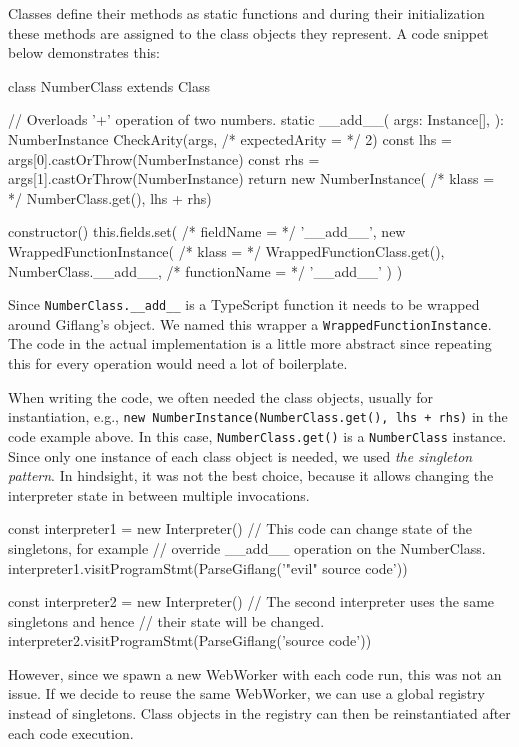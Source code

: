 Classes define their methods as static functions and during their initialization these methods are assigned to the class objects they represent.
A code snippet below demonstrates this:
\begin{code}
class NumberClass extends Class {
    // Overloads '+' operation of two numbers.
    static __add__(
        args: Instance[],
    ): NumberInstance {
        CheckArity(args, /* expectedArity = */ 2)
        const lhs = args[0].castOrThrow(NumberInstance)
        const rhs = args[1].castOrThrow(NumberInstance)
        return new NumberInstance(
            /* klass = */ NumberClass.get(), lhs + rhs)
    }

    constructor() {
        this.fields.set(
            /* fieldName = */ '__add__',
            new WrappedFunctionInstance(
                /* klass = */ WrappedFunctionClass.get(),
                NumberClass.__add__,
                /* functionName = */ '__add__'
            )
        )
    }
}
\end{code}

Since \texttt{NumberClass.\_\_add\_\_} is a TypeScript function it needs to be wrapped around Giflang's object. We named this wrapper a \texttt{WrappedFunctionInstance}.
The code in the actual implementation is a little more abstract since repeating this for every operation would need a lot of boilerplate.

When writing the code, we often needed the class objects, usually for instantiation, e.g.,
\texttt{new NumberInstance(NumberClass.get(), lhs + rhs)} in the code example above. In this case, \texttt{NumberClass.get()} is a \texttt{NumberClass} instance. Since only one
instance of each class object is needed, we used \emph{the singleton pattern}. In hindsight, it was not the best choice, because it allows changing
the interpreter state in between multiple invocations.
\begin{code}
const interpreter1 = new Interpreter()
// This code can change state of the singletons, for example
// override __add__ operation on the NumberClass.
interpreter1.visitProgramStmt(ParseGiflang('"evil" source code'))

const interpreter2 = new Interpreter()
// The second interpreter uses the same singletons and hence
// their state will be changed.
interpreter2.visitProgramStmt(ParseGiflang('source code'))
\end{code}

However, since we spawn a new WebWorker with each code run, this was not an issue. If we decide to reuse the same WebWorker, we can use a global registry
instead of singletons. Class objects in the registry can then be reinstantiated after each code execution.

